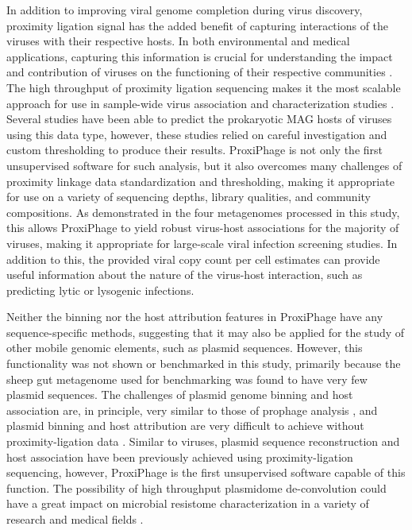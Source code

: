 In addition to improving viral genome completion during virus discovery, proximity ligation signal has the added benefit of capturing interactions of the viruses with their respective hosts. In both environmental and medical applications, capturing this information is crucial for understanding the impact and contribution of viruses on the functioning of their respective communities \cite{RN2989}. The high throughput of proximity ligation sequencing makes it the most scalable approach for use in sample-wide virus association and characterization studies \cite{RN2984, RN2980}. Several studies have been able to predict the prokaryotic MAG hosts of viruses using this data type, however, these studies relied on careful investigation and custom thresholding to produce their results. ProxiPhage is not only the first unsupervised software for such analysis, but it also overcomes many challenges of proximity linkage data standardization and thresholding, making it appropriate for use on a variety of sequencing depths, library qualities, and community compositions. As demonstrated in the four metagenomes processed in this study, this allows ProxiPhage to yield robust virus-host associations for the majority of viruses, making it appropriate for large-scale viral infection screening studies. In addition to this, the provided viral copy count per cell estimates can provide useful information about the nature of the virus-host interaction, such as predicting lytic or lysogenic infections.

Neither the binning nor the host attribution features in ProxiPhage have any sequence-specific methods, suggesting that it may also be applied for the study of other mobile genomic elements, such as plasmid sequences. However, this functionality was not shown or benchmarked in this study, primarily because the sheep gut metagenome used for benchmarking was found to have very few plasmid sequences. The challenges of plasmid genome binning and host association are, in principle, very similar to those of prophage analysis \cite{RN16}, and plasmid binning and host attribution are very difficult to achieve without proximity-ligation data \cite{RN2991, RN2904}. Similar to viruses, plasmid sequence reconstruction \cite{RN2992} and host association \cite{RN2993, RN16} have been previously achieved using proximity-ligation sequencing, however, ProxiPhage is the first unsupervised software capable of this function. The possibility of high throughput plasmidome de-convolution could have a great impact on microbial resistome characterization in a variety of research and medical fields \cite{RN2904}. 

